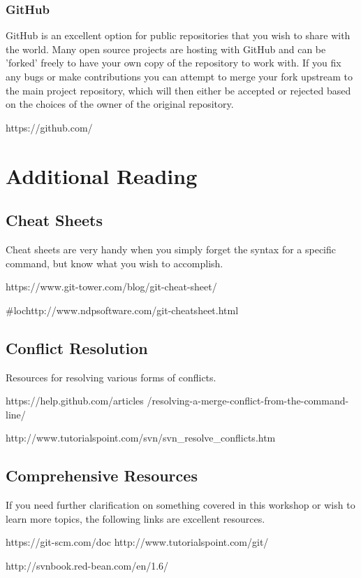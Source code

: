 \documentclass[oneside]{book}
\begin{document}
\subsection{GitHub}
GitHub is an excellent option for public repositories that you wish to share with the world. Many open source projects are hosting with GitHub and can be 'forked' freely to have your own copy of the repository to work with. If you fix any bugs or make contributions you can attempt to merge your fork upstream to the main project repository, which will then either be accepted or rejected based on the choices of the owner of the original repository. 
    \begin{gitcode}
    https://github.com/
    \end{gitcode}



\chapter{Additional Reading}
\section{Cheat Sheets}
Cheat sheets are very handy when you simply forget the syntax for a specific command, but know what you wish to accomplish.

    \begin{gitcode}
    https://www.git-tower.com/blog/git-cheat-sheet/
    \end{gitcode}
    
    \begin{gitcode}
    #lochttp://www.ndpsoftware.com/git-cheatsheet.html
    \end{gitcode}
    

\section{Conflict Resolution}
Resources for resolving various forms of conflicts.
    \begin{gitcode}
    https://help.github.com/articles
    /resolving-a-merge-conflict-from-the-command-line/
    \end{gitcode}
    \begin{svncode}
    http://www.tutorialspoint.com/svn/svn_resolve_conflicts.htm
    \end{svncode}


\section{Comprehensive Resources}
If you need further clarification on something covered in this workshop or wish to learn more topics, the following links are excellent resources. 
    \begin{gitcode}
    https://git-scm.com/doc
    http://www.tutorialspoint.com/git/
    \end{gitcode}
    \begin{svncode}
    http://svnbook.red-bean.com/en/1.6/
    \end{svncode}
\end{document}
